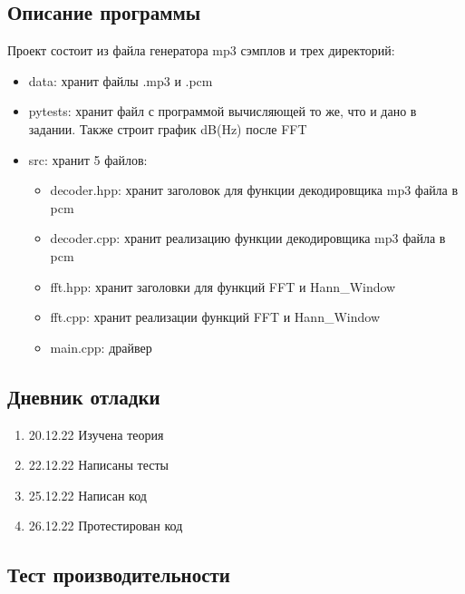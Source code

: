 \documentclass[12pt]{article}
\begin{document}
    \subsection*{Описание программы}

    Проект состоит из файла генератора mp3 сэмплов и трех директорий:
    \begin{itemize}
        \item data: хранит файлы .mp3 и .pcm
        \item pytests: хранит файл с программой вычисляющей то же, что и дано в задании. Также строит график dB(Hz) после FFT
        \item src: хранит 5 файлов:
            \begin{itemize}
                \item decoder.hpp: хранит заголовок для функции декодировщика mp3 файла в pcm
                \item decoder.cpp: хранит реализацию функции декодировщика mp3 файла в pcm
                \item fft.hpp: хранит заголовки для функций FFT и Hann\_Window 
                \item fft.cpp: хранит реализации функций FFT и Hann\_Window 
                \item main.cpp: драйвер
            \end{itemize}
    \end{itemize}

    \subsection*{Дневник отладки}

    \begin{enumerate}
        \item 20.12.22 Изучена теория
        \item 22.12.22 Написаны тесты
        \item 25.12.22 Написан код
        \item 26.12.22 Протестирован код
    \end{enumerate}

    \subsection*{Тест производительности}
\end{document}
